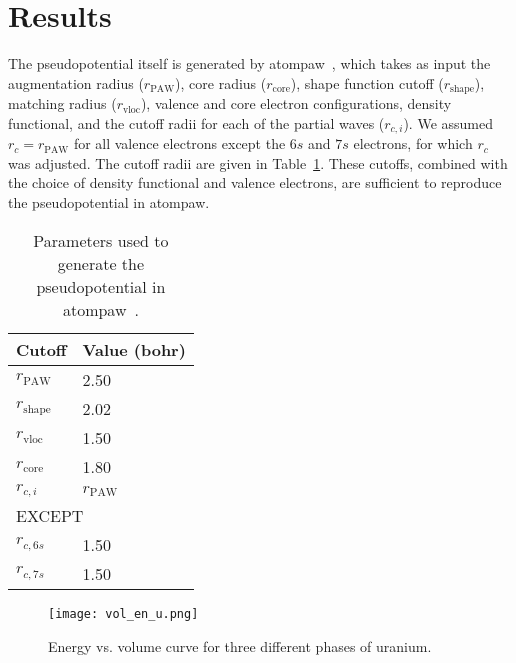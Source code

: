 \section{Results}
The pseudopotential itself is generated by
atompaw~\cite{holzwarth2001projector,tackett2001projector}, which takes as
input the augmentation radius ($r_\text{PAW}$), core radius ($r_\text{core}$),
shape function cutoff ($r_\text{shape}$), matching radius ($r_\text{vloc}$),
valence and core electron configurations, density functional, and the
cutoff radii for each of the partial waves ($r_{c,i}$). We assumed
$r_c = r_\text{PAW}$ for all valence electrons except the $6s$ and $7s$
electrons, for which $r_c$ was adjusted. The cutoff radii are given in
Table~\ref{table:pseudopotential}.
These cutoffs, combined with the choice of density functional and valence
electrons, are sufficient to reproduce the pseudopotential in atompaw.
\begin{table}
  \caption[Parameters used to generate the pseudopotential in
    atompaw]{Parameters used to generate the pseudopotential in
    atompaw~\cite{holzwarth2001projector,tackett2001projector}.}
  \label{table:pseudopotential}
  \centering
  \begin{tabular}{l l}
    \toprule
    Cutoff & Value (bohr) \\
    \midrule
    $r_\text{PAW}^{}$   & 2.50 \\
    $r_\text{shape}^{}$ & 2.02 \\
    $r_\text{vloc}^{}$  & 1.50 \\
    $r_\text{core}^{}$  & 1.80 \\
    \midrule
    $r_{c,i}^{}$ & $r_\text{PAW}$ \\
    \multicolumn{2}{l}{\quad EXCEPT} \\
    $r_{c,6s}^{}$       & 1.50 \\
    $r_{c,7s}^{}$       & 1.50 \\
    \bottomrule
  \end{tabular}
\end{table}

\begin{figure}
	\centering
	\texttt{[image: vol\_en\_u.png]}
	\caption{Energy vs. volume curve for three different phases of uranium.}
	\label{fig:envsvolu}
\end{figure}

